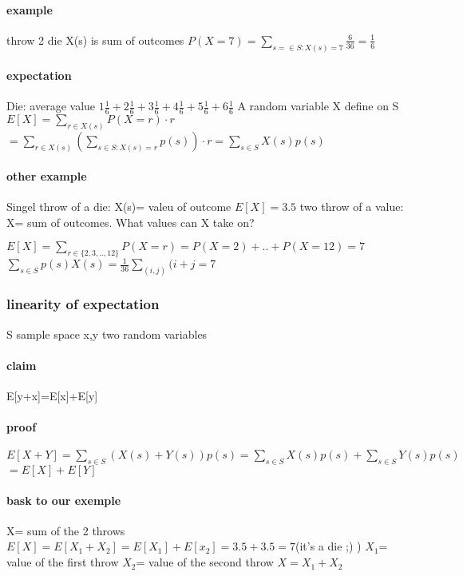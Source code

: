 \documentclass[a4paper,10pt]{article}
\begin{document}
\paragraph{example}
throw 2 die X(s) is sum of outcomes
\newline
$P(X=7)=\sum_{s=\in S:X(s)=7}\frac{6}{36}=\frac{1}{6}$
\paragraph{expectation}
Die: average value
\newline
$1\frac{1}{6}+2\frac{1}{6}+3\frac{1}{6}+4\frac{1}{6}+5\frac{1}{6}+6\frac{1}{6}$
\newline
A random variable X define on S
\newline
$E[X]=\sum_{r\in X(s)}P(X=r)\cdot r$
\newline
$=\sum_{r \in X(s)}(\sum_{s\in S: X(s)=r}p(s))\cdot r=\sum_{s\in S}X(s)p(s)$
\paragraph{other example}
Singel throw of a die: X(s)= valeu of outcome $E[X]=3.5$
\newline
two throw of a value: X= sum of outcomes. What values can X take on?
\newline

$E[X]=\sum_{r\in \{2,3,..,12\}}P(X=r)=P(X=2)+..+P(X=12)=7$
\newline
$\sum_{s\in S}p(s)X(s)=\frac{1}{36}\sum_{(i,j)}(i+j=7$
\subsubsection{linearity of expectation}
S sample space 
\newline
x,y two random variables
\paragraph{claim}
E[y+x]=E[x]+E[y]
\paragraph{proof}
$E[X+Y]=\sum_{s\in S}(X(s)+Y(s))p(s)=\sum_{s\in S}X(s)p(s)+\sum_{s\in S}Y(s)p(s)$
\newline
$=E[X]+E[Y]$
\paragraph{bask to our exemple}
X= sum of the 2 throws
\newline
$E[X]=E[X_1+X_2]=E[X_1]+E[x_2]=3.5+3.5=7$(it's a die ;) )
\newline
$X_1$= value of the first throw
\newline
$X_2$= value of the second throw
\newline
$X=X_1+X_2$
\end{document}
